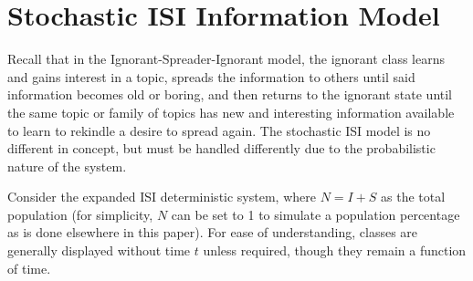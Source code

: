 \section{Stochastic ISI Information Model}
Recall that in the Ignorant-Spreader-Ignorant model, the ignorant class learns and gains interest in a topic, spreads the information to others until said information becomes old or boring, and then returns to the ignorant state until the same topic or family of topics has new and interesting information available to learn to rekindle a desire to spread again. The stochastic ISI model is no different in concept, but must be handled differently due to the probabilistic nature of the system. 

Consider the expanded ISI deterministic system, where $N=I+S$ as the total population (for simplicity, $N$ can be set to 1 to simulate a population percentage as is done elsewhere in this paper). For ease of understanding, classes are generally displayed without time $t$ unless required, though they remain a function of time.

